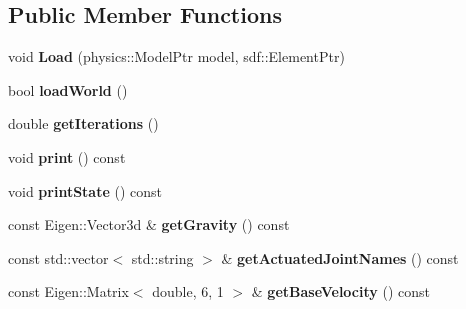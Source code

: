 \subsection*{Public Member Functions}
\begin{DoxyCompactItemize}
\item 
\mbox{\label{classgazebo_1_1_panda_simulation_ac1c50ed325e6f05209f0586593bed996}} 
void {\bfseries Load} (physics\+::\+Model\+Ptr model, sdf\+::\+Element\+Ptr)
\item 
\mbox{\label{classgazebo_1_1_panda_simulation_acfea2cf28afae4d972657ba5a2ac3fce}} 
bool {\bfseries load\+World} ()
\item 
\mbox{\label{classgazebo_1_1_panda_simulation_ae55621ade589fa28441d6a6e1156161d}} 
double {\bfseries get\+Iterations} ()
\item 
\mbox{\label{classgazebo_1_1_panda_simulation_ac4aff98571705909a74bb7f65a40a8ec}} 
void {\bfseries print} () const
\item 
\mbox{\label{classgazebo_1_1_panda_simulation_a6207a68e3517f272140b2054da202227}} 
void {\bfseries print\+State} () const
\item 
\mbox{\label{classgazebo_1_1_panda_simulation_a0012e76a974d6f4abd83ea1cd9afaa4b}} 
const Eigen\+::\+Vector3d \& {\bfseries get\+Gravity} () const
\item 
\mbox{\label{classgazebo_1_1_panda_simulation_ae433d080b82acb85649dd7b4b303698e}} 
const std\+::vector$<$ std\+::string $>$ \& {\bfseries get\+Actuated\+Joint\+Names} () const
\item 
\mbox{\label{classgazebo_1_1_panda_simulation_a053ccf46d079a7f0e345d2588994fc2b}} 
const Eigen\+::\+Matrix$<$ double, 6, 1 $>$ \& {\bfseries get\+Base\+Velocity} () const
\item 
\mbox{\label{classgazebo_1_1_panda_simulation_a8631b9b7d6294b6d78b0ce346c6f9ebb}} 

\end{DoxyCompactItemize}
